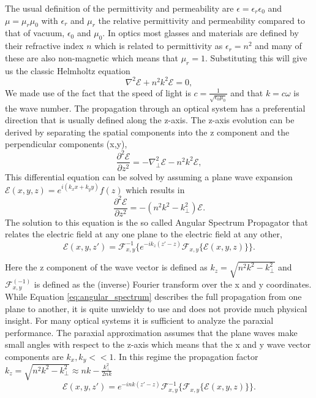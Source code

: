 \documentclass[letterpaper]{ar-1col}
\begin{document}
The usual definition of the permittivity and permeability are $\epsilon=\epsilon_r \epsilon_0$ and $\mu=\mu_r \mu_0$ with $\epsilon_r$ and $\mu_r$ the relative permittivity and permeability compared to that of vacuum, $\epsilon_0$ and $\mu_0$. In optics most glasses and materials are defined by their refractive index $n$ which is related to permittivity as $\epsilon_r = n^2$ and many of these are also non-magnetic which means that $\mu_r=1$. Substituting this will give us the classic Helmholtz equation
\begin{equation}
\nabla^2\mathcal{E} + n^2k^2 \mathcal{E} = 0,
\end{equation}
We made use of the fact that the speed of light is $c = \frac{1}{\sqrt{\epsilon_0\mu_0}}$ and that $k = c\omega$ is the wave number. The propagation through an optical system has a preferential direction that is usually defined along the z-axis. The z-axis evolution can be derived by separating the spatial components into the z component and the perpendicular components (x,y),
\begin{equation}
\frac{\partial^2\mathcal{E}}{\partial z^2} = -\nabla_{\perp}^2\mathcal{E}-n^2k^2 \mathcal{E},
\end{equation}
This differential equation can be solved by assuming a plane wave expansion $\mathcal{E}(x,y,z)=e^{i(k_x x + k_y y)}f(z)$ which results in
\begin{equation}
\frac{\partial^2\mathcal{E}}{\partial z^2} = -(n^2k^2 - k_{\perp}^2)\mathcal{E}.
\end{equation}
The solution to this equation is the so called Angular Spectrum Propagator that relates the electric field at any one plane to the electric field at any other,
\begin{equation}
\label{eq:angular_spectrum}
\mathcal{E}(x, y, z') = \mathcal{F}_{x,y}^{-1}\{e^{-ik_z(z'-z)}\mathcal{F}_{x,y}\{\mathcal{E}(x,y,z)\}\}.
\end{equation}

Here the z component of the wave vector is defined as $k_z=\sqrt{n^2k^2 - k_{\perp}^2}$ and $\mathcal{F}_{x,y}^{(-1)}$ is defined as the (inverse) Fourier transform over the x and y coordinates. While Equation \ref{eq:angular_spectrum} describes the full propagation from one plane to another, it is quite unwieldy to use and does not provide much physical insight. For many optical systems it is sufficient to analyze the paraxial performance. The paraxial approximation assumes that the plane waves make small angles with respect to the z-axis which means that the x and y wave vector components are $k_x,k_y<<1$. In this regime the propagation factor $k_z=\sqrt{n^2k^2 - k_{\perp}^2}\approx nk - \frac{k_{\perp}^2}{2nk}$
\begin{equation}
\label{eq:angular_spectrum2}
\mathcal{E}(x, y, z') = e^{-ink(z'-z)} \mathcal{F}_{x,y}^{-1}\{\mathcal{F}_{x,y}\{\mathcal{E}(x,y,z)\}\}.
\end{equation}
\end{document}
